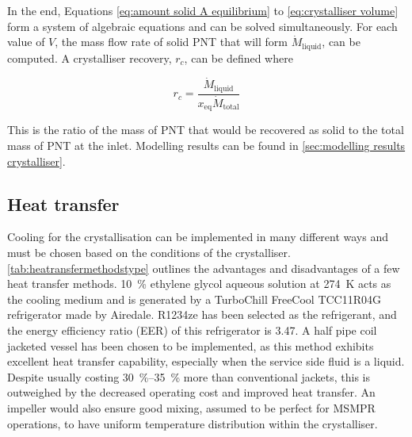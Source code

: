 In the end, Equations \ref{eq:amount solid A equilibrium} to \ref{eq:crystalliser volume} form a system of algebraic equations and can be solved simultaneously. For each value of $V$, the mass flow rate of solid PNT that will form $\dot{M}_{\mathrm{liquid}}$, can be computed. A crystalliser recovery, $r_c$, can be defined where

\begin{equation} \label{eq:definition of recovery}
    r_c = \frac{\dot{M}_{\mathrm{liquid}}}{x_{\mathrm{eq}} \dot{M}_{\mathrm{total}}}
\end{equation}

\noindent This is the ratio of the mass of PNT that would be recovered as solid to the total mass of PNT at the inlet. Modelling results can be found in \cref{sec:modelling results crystalliser}.

\subsection{Heat transfer}\label{sec:heat transfer crystalliser}

Cooling for the crystallisation can be implemented in many different ways and must be chosen based on the conditions of the crystalliser. \cref{tab:heatransfermethodstype} outlines the advantages and disadvantages of a few heat transfer methods. \SI{10}{\percent} ethylene glycol aqueous solution at \SI{274}{\K} acts as the cooling medium and is generated by a TurboChill FreeCool TCC11R04G refrigerator made by Airedale. R1234ze has been selected as the refrigerant, and the energy efficiency ratio (EER) of this refrigerator is 3.47. A half pipe coil jacketed vessel has been chosen to be implemented, as this method exhibits excellent heat transfer capability, especially when the service side fluid is a liquid. Despite usually costing \SIrange{30}{35}{\percent} more than conventional jackets, this is outweighed by the decreased operating cost and improved heat transfer. An impeller would also ensure good mixing, assumed to be perfect for MSMPR operations, to have uniform temperature distribution within the crystalliser. 

